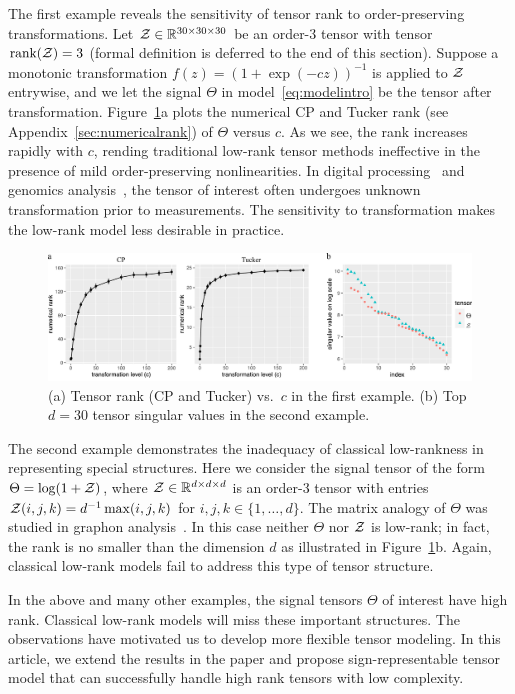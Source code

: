 \documentclass[twoside,11pt]{article}
\theoremstyle{plain}
\theoremstyle{definition}
\begin{document}
The first example reveals the sensitivity of tensor rank to order-preserving transformations. Let $\mathcal{Z} \in \mathbb{R}^{30\times 30\times 30}$ be an order-3 tensor with tensor $\text{rank}(\mathcal{Z})=3$ (formal definition is deferred to the end of this section). Suppose a monotonic transformation $f(z)=(1+\exp(-cz))^{-1}$ is applied to $\mathcal{Z}$ entrywise, and we let the signal $\Theta$ in model~\eqref{eq:modelintro} be the tensor after transformation. Figure~\ref{fig:example}a plots the numerical CP and Tucker rank (see Appendix~\ref{sec:numericalrank}) of $\Theta$ versus $c$. As we see, the rank increases rapidly with $c$, rending traditional low-rank tensor methods ineffective in the presence of mild order-preserving nonlinearities. In  digital processing~\citep{ghadermarzy2018learning} and genomics analysis~\citep{hore2016tensor}, the tensor of interest often undergoes unknown transformation prior to measurements. The sensitivity to transformation makes the low-rank model less desirable in practice. 
\begin{figure}[h]
\centering
\includegraphics[width=\textwidth]{figure/example_ncomb.pdf}
\caption{(a) Tensor rank (CP and Tucker) vs.\ $c$ in the first example. (b) Top $d=30$ tensor singular values in the second example. }
\label{fig:example}
\end{figure}
The second example demonstrates the inadequacy of classical low-rankness in representing special structures. Here we consider the signal tensor of the form $\Theta=\log(1+\mathcal{Z})$, where $\mathcal{Z}\in\mathbb{R}^{d\times d\times d}$ is an order-3 tensor with entries $\mathcal{Z}(i,j,k)=d^{-1}\max(i,j,k)$ for $i,j,k\in\{1,\ldots,d\}$. The matrix analogy of $\Theta$ was studied in graphon analysis~\cite{chan2014consistent}. In this case neither $\Theta$ nor $\mathcal{Z}$ is low-rank; in fact, the rank is no smaller than the dimension $d$ as illustrated in Figure~\ref{fig:example}b. Again, classical low-rank models fail to address this type of tensor structure. 

In the above and many other examples, the signal tensors $\Theta$ of interest have high rank. Classical low-rank models will miss these important structures. The observations have motivated us to develop more flexible tensor modeling.
In this article, we extend the results in the paper \citep{lee2021beyond} and propose sign-representable tensor model that can successfully handle high rank tensors with low complexity.
\end{document}
